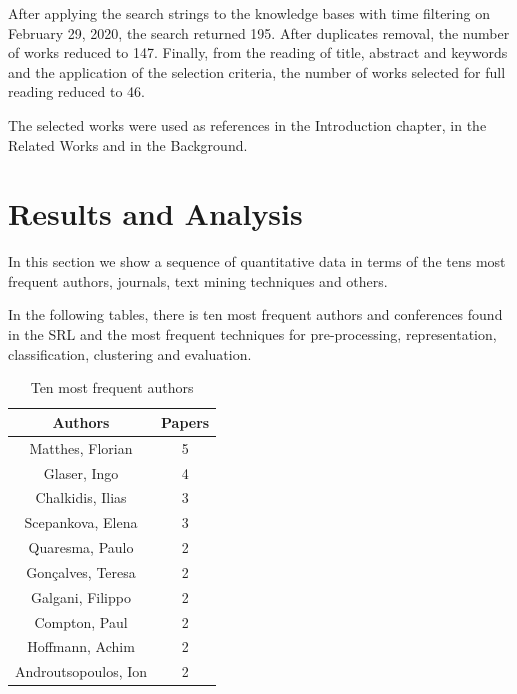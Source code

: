 After applying the search strings to the knowledge bases with time filtering on February 29, 2020, the search returned 195. After duplicates removal, the number of works reduced to 147. Finally, from the reading of title, abstract and keywords and the application of the selection criteria, the number of works selected for full reading reduced to 46.

The selected works were used as references in the Introduction chapter, in the Related Works and in the Background.

\section{Results and Analysis}
In this section we show a sequence of quantitative data in terms of the tens most frequent authors, journals, text mining techniques and others.

In the following tables, there is ten most frequent authors and conferences found in the SRL and the most frequent techniques for pre-processing, representation, classification, clustering and evaluation.



\begin{table}[H]
    \centering
    \caption{Ten most frequent authors}
    \label{tab:rsl_freq_authors}
    \begin{tabular}{@{}cc@{}}
    
    \toprule
    \textbf{Authors}     & \textbf{Papers} \\ \midrule
    Matthes, Florian     & 5               \\
    Glaser, Ingo         & 4               \\
    Chalkidis, Ilias     & 3               \\
    Scepankova, Elena    & 3               \\
    Quaresma, Paulo      & 2               \\
    Gonçalves, Teresa    & 2               \\
    Galgani, Filippo     & 2               \\
    Compton, Paul        & 2               \\
    Hoffmann, Achim      & 2               \\
    Androutsopoulos, Ion & 2               \\ \bottomrule
    
    \end{tabular}
\end{table}

